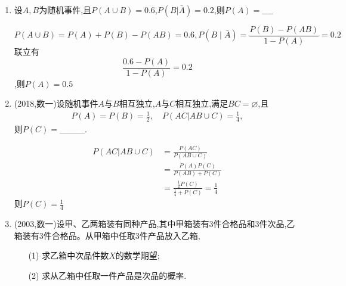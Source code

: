 \documentclass[12pt, a4paper, oneside, UTF8]{ctexbook}
\begin{document}
\begin{enumerate}[label=\arabic*.,start=9]
    \item 设$A,B$为随机事件,且$P(A\cup B)=0.6$,$P(B|\bar{A})=0.2$,则$P(A)=\_\_\_\_$
    
    \begin{solution}
    \[P(A\cup B)=P(A) + P(B) - P(AB) = 0.6, P(B\mid\bar{A})=\frac{P(B)-P(AB)}{1-P(A)} = 0.2\]
    联立有
    \[\frac{0.6 - P(A)}{1 - P(A)} = 0.2\],则$P(A)=0.5$
    \end{solution}
    
    \item  (2018,数一)设随机事件$A$与$B$相互独立,$A$与$C$相互独立,满足$BC=\varnothing$,且
    \begin{align*}
        P(A)=P(B)=\frac{1}{2},\quad P(AC|AB\cup C)=\frac{1}{4},
    \end{align*}
    则$P(C)=$\_\_\_\_.
    
    \begin{solution}
    \begin{align*}
        P(AC|AB\cup C)
        &= \frac{P(AC)}{P(AB\cup C)} \\
        &=\frac{P(A)P(C)}{P(AB)+P(C)} \\
        &=\frac{\frac{1}{2}P(C)}{\frac{1}{4} + P(C)} = \frac{1}{4}
    \end{align*}
    则$P(C)=\frac{1}{4}$
    \end{solution}
    
    \item  (2003,数一)设甲、乙两箱装有同种产品,其中甲箱装有3件合格品和3件次品,乙箱装有3件合格品。从甲箱中任取3件产品放入乙箱,
    \begin{enumerate}[label=(\roman*)]
        \item[(1)] 求乙箱中次品件数$X$的数学期望;
        \item[(2)] 求从乙箱中任取一件产品是次品的概率.
    \end{enumerate}


\end{enumerate}
\end{document}
